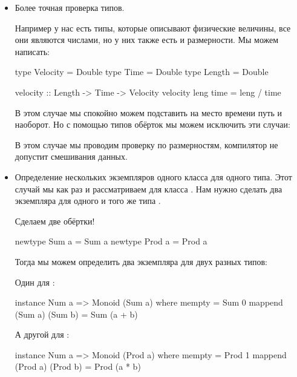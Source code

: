 \begin{itemize}
\item Более точная проверка типов.

Например у нас есть типы, которые описывают
физические величины, все они являются числами,
но у них также есть и размерности. Мы можем написать:

\begin{code}
type Velocity   = Double
type Time       = Double
type Length     = Double

velocity :: Length -> Time -> Velocity
velocity leng time = leng / time
\end{code}

В этом случае мы спокойно можем подставить на
место времени путь и наоборот. Но с помощью
типов обёрток мы можем исключить эти случаи:


В этом случае мы проводим проверку по размерностям,
компилятор не допустит смешивания данных.


\item Определение нескольких экземпляров одного класса
        для одного типа. Этот случай мы как раз и рассматриваем
        для класса . Нам нужно сделать два
        экземпляра для одного и того же типа .

        Сделаем две обёртки! 

\begin{code}
newtype Sum  a = Sum  a
newtype Prod a = Prod a
\end{code}

Тогда мы можем определить два экземпляра для двух
разных типов:

Один для :

\begin{code}
instance Num a => Monoid (Sum a) where
    mempty  = Sum 0
    mappend (Sum a) (Sum b) = Sum (a + b)
\end{code}

А другой для :

\begin{code}
instance Num a => Monoid (Prod a) where
    mempty  = Prod 1
    mappend (Prod a) (Prod b) = Prod (a * b)
\end{code}

\end{itemize}

